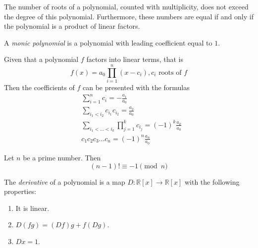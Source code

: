\documentclass{article}
\begin{document}
      \begin{theorem}
        The number of roots of a polynomial, counted with multiplicity, does not exceed the degree of this polynomial. Furthermore, these numbers are equal if and only if the polynomial is a product of linear factors.
      \end{theorem}

      \begin{definition}
        A \textit{monic polynomial} is a polynomial with leading coefficient equal to $1$. 
      \end{definition}

      \begin{theorem}
        Given that a polynomial $f$ factors into linear terms, that is 
        \begin{equation}
          f(x) = a_0 \prod_{i = 1}^{n} (x - c_i), c_i \text{ roots of } f
        \end{equation}
        Then the coefficients of $f$ can be presented with the formulas
        \begin{align*}
          & \sum_{i=1}^n c_i = - \frac{a_1}{a_0} \\
          & \sum_{i_1 < i_2} c_{i_1} c_{i_2} = \frac{a_2}{a_0} \\
          & \sum_{i_1< ...< i_k} \prod_{j = 1}^{k} c_{i_j} = (-1)^k \frac{a_k}{a_0} \\
          & c_1 c_2 c_3 ... c_n = (-1)^n \frac{a_n}{a_0}
        \end{align*}
      \end{theorem}

      \begin{theorem}
        Let $n$ be a prime number. Then 
        \begin{equation}
          (n-1)! \equiv -1 \pmod{n}
        \end{equation}
      \end{theorem}

      \begin{definition}
        The \textit{derivative} of a polynomial is a map $D: \mathbb{R}[x] \longrightarrow \mathbb{R}[x]$ with the following properties:
        \begin{enumerate}
          \item It is linear. 
          \item $D(f g) = (D f) g + f (D g)$. 
          \item $D x = 1$. 
        \end{enumerate}
      \end{definition}
\end{document}
